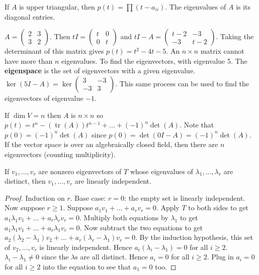 \documentclass{article}
\newcommand{\vocab}[1]{\textbf{\color{blue!90}\boldmath #1}}
\DeclareMathOperator{\tr}{tr}
\begin{document}
\begin{example}
If $A$ is upper triangular, then $p(t)=\prod (t-a_{ii})$. The eigenvalues of $A$ is its diagonal entries.
\end{example}
\begin{example}
$A=\begin{pmatrix}
2&3\\
3&2
\end{pmatrix}$. Then $tI=\begin{pmatrix}
t&0\\
0&t
\end{pmatrix}$ and $tI-A=\begin{pmatrix}
t-2&-3\\
-3&t-2
\end{pmatrix}$. Taking the determinant of this matrix gives $p(t)=t^2-4t-5$. An $n\times n$ matrix cannot have more than $n$ eigenvalues. To find the eigenvectors, with eigenvalue 5. The \vocab{eigenspace} is the set of eigenvectors with a given eigenvalue. $\ker(5I-A)=\ker\begin{pmatrix}
3&-3\\
-3&3
\end{pmatrix}$. This same process can be used to find the eigenvectors of eigenvalue $-1$.
\end{example}
If $\dim V=n$ then $A$ is $n\times n$ so $p(t)=t^n-(\tr(A))t^{n-1}+...+(-1)^n\det(A)$. Note that $p(0)=(-1)^n\det(A)$ since $p(0)=\det(0I-A)=(-1)^n\det(A)$. If the vector space is over an algebraically closed field, then there are $n$ eigenvectors (counting multiplicity).
\begin{proposition}
If $v_1,...,v_r$ are nonzero eigenvectors of $T$ whose eigenvalues of $\lambda_1,...,\lambda_r$ are distinct, then $v_1,...,v_r$ are linearly independent.
\end{proposition}
\begin{proof}
Induction on $r$. Base case: $r=0$: the empty set is linearly independent. Now suppose $r\geq 1$. Suppose $a_1v_1+...+a_rv_r=0$. Apply $T$ to both sides to get $a_1\lambda_1v_1+...+a_r\lambda_rv_r=0$. Multiply both equations by $\lambda_1$ to get $a_1\lambda_1v_1+...+a_r\lambda_1v_r=0$. Now subtract the two equations to get $a_2(\lambda_2-\lambda_1)v_2+...+a_r(\lambda_r-\lambda_1)v_r=0$. By the induction hypothesis, this set of $v_2,...,v_r$ is linearly independent. Hence $a_i(\lambda_i-\lambda_1)=0$ for all $i\geq 2$. $\lambda_i-\lambda_1\neq0$ since the $\lambda$s are all distinct. Hence $a_i=0$ for all $i\geq 2$. Plug in $a_i=0$ for all $i\geq 2$ into the equation to see that $a_1=0$ too.
\end{proof}
\end{document}
